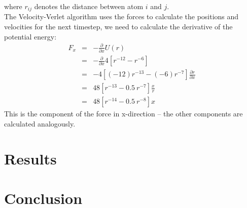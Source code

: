 \documentclass[12pt]{article}
\begin{document}
where $r_{ij}$ denotes the distance between atom $i$ and $j$. \\
The Velocity-Verlet algorithm uses the forces to calculate the positions and velocities for the next timestep, we need to calculate the derivative of
the potential energy:
\begin{eqnarray}
    F_{x} &=& -\frac{\partial}{\partial x} U(r) \nonumber\\
                &=& -\frac{\partial}{\partial x} 4\left[{r}^{-12} - {r}^{-6}\right] \nonumber\\
                &=& -4 \left[(-12){r}^{-13} - (-6){r}^{-7}\right] \frac{\partial r}{\partial x} \nonumber\\
                &=& 48 \left[r^{-13} - 0.5 \ r^{-7}\right] \frac{x}{r} \nonumber\\
    \label{eq:ljforce} &=& 48 \left[r^{-14} - 0.5 \ r^{-8}\right] x
\end{eqnarray}
This is the component of the force in x-direction -- the other components are calculated analogously.






\newpage
\section{Results}





\newpage
\section{Conclusion}






\newpage


\end{document}
